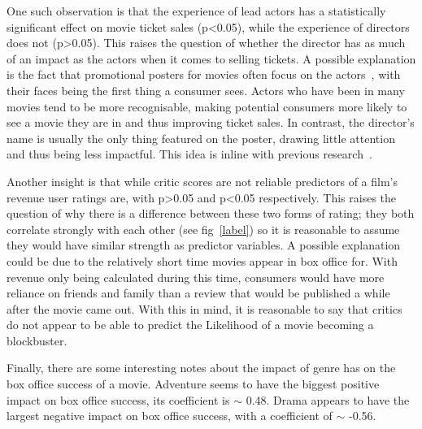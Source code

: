             One such observation is that the experience of lead actors has a statistically
                significant effect on movie ticket sales (p<0.05), while the experience of
                directors does not (p>0.05).
            This raises the question of whether the director has as much of an impact as
                the actors when it comes to selling tickets.
            A possible explanation is the fact that promotional posters for movies often
                focus on the actors~\cite{label}, with their faces being the first thing a
                consumer sees.
            Actors who have been in many movies tend to be more recognisable, making
                potential consumers more likely to see a movie they are in and thus improving
                ticket sales.
            In contrast, the director's name is usually the only thing featured on the
                poster, drawing little attention and thus being less impactful.
            This idea is inline with previous research~\cite{label}.

            Another insight is that while critic scores are not reliable predictors of a
                film's revenue user ratings are, with p>0.05 and p<0.05 respectively.
            This raises the question of why there is a difference between these two forms
                of rating; they both correlate strongly with each other (see fig~\ref{label})
                so it is reasonable to assume they would have similar strength as predictor
                variables.
            A possible explanation could be due to the relatively short time movies appear
                in box office for.
            With revenue only being calculated during this time, consumers would have more
                reliance on friends and family than a review that would be published a while
                after the movie came out.
            With this in mind, it is reasonable to say that critics do not appear to be
                able to predict the Likelihood of a movie becoming a blockbuster.

            Finally, there are some interesting notes about the impact of genre has on the
                box office success of a movie.
            Adventure seems to have the biggest positive impact on box office success, its
                coefficient is $\sim$ 0.48.
            Drama appears to have the largest negative impact on box office success, with a
                coefficient of $\sim$ -0.56.

